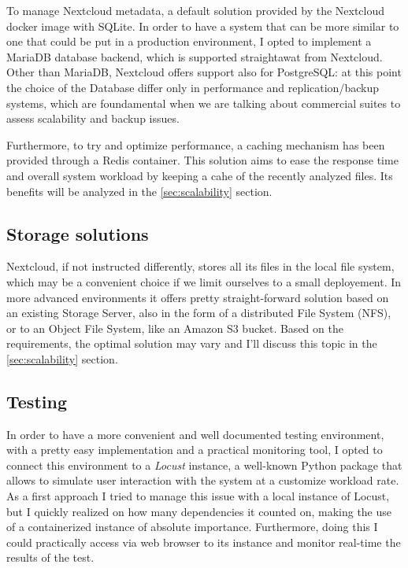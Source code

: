 \documentclass{article}
\begin{document}
	To manage Nextcloud metadata, a default solution provided by the Nextcloud docker image with SQLite. In order to have a system that can be more similar to one that could be put in a production environment, I opted to implement a MariaDB database backend, which is supported straightawat from Nextcloud. Other than MariaDB, Nextcloud offers support also for PostgreSQL: at this point the choice of the Database differ only in performance and replication/backup systems, which are foundamental when we are talking about commercial suites to assess scalability and backup issues.
	
	Furthermore, to try and optimize performance, a caching mechanism has been provided through a Redis container. This solution aims to ease the response time and overall system workload by keeping a cahe of the recently analyzed files. Its benefits will be analyzed in the \ref*{sec:scalability} section.
	
	\subsection{Storage solutions}
	Nextcloud, if not instructed differently, stores all its files in the local file system, which may be a convenient choice if we limit ourselves to a small deployement. In more advanced environments it offers pretty straight-forward solution based on an existing Storage Server, also in the form of a distributed File System (NFS), or to an Object File System, like an Amazon S3 bucket. Based on the requirements, the optimal solution may vary and I'll discuss this topic in the \ref{sec:scalability} section.
	
	\subsection{Testing}
	In order to have a more convenient and well documented testing environment, with a pretty easy implementation and a practical monitoring tool, I opted to connect this environment to a \textit{Locust} instance, a well-known Python package that allows to simulate user interaction with the system at a customize workload rate. As a first approach I tried to manage this issue with a local instance of Locust, but I quickly realized on how many dependencies it counted on, making the use of a containerized instance of absolute importance. Furthermore, doing this I could practically access via web browser to its instance and monitor real-time the results of the test.
	
\end{document}
